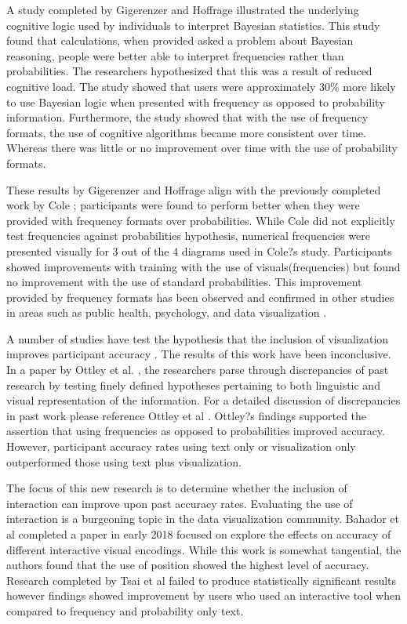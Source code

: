 A study completed by Gigerenzer and Hoffrage \cite{Gigerenzer1995} illustrated the
underlying cognitive logic used by individuals to interpret Bayesian
statistics. This study found that calculations, when provided asked a problem about Bayesian reasoning, people were better able to interpret frequencies rather than probabilities. The researchers
hypothesized that this was a result of reduced cognitive load. The study showed that users were
approximately 30\% more likely to use Bayesian logic when presented with
frequency as opposed to probability information. Furthermore, the study
showed that with the use of frequency formats, the use of cognitive
algorithms became more consistent over time. Whereas there was little or no
improvement over time with the use of probability formats.

These results by Gigerenzer and Hoffrage \cite{Gigerenzer1995} align with the
previously completed work by Cole \cite{Cole1989}; participants were found to
perform better when they were provided with frequency formats over
probabilities. While Cole did not explicitly test frequencies against
probabilities hypothesis, numerical frequencies were presented visually for 3
out of the 4 diagrams used in Cole?s study. Participants showed improvements
with training with the use of visuals(frequencies) but found no improvement
with the use of standard probabilities. This improvement provided by frequency formats has been observed and confirmed in other studies in areas such as public health, psychology, and data visualization \cite{Eddy1982, Galesic2009, Cohen2007, Brown2014, Brase2009}. 

A number of studies have test the hypothesis that the inclusion of
visualization improves participant accuracy \cite{Brown2014, Friederichs2014,
Cohen2007}. The results of this work have been inconclusive. In a paper by
Ottley et al. \cite{Ottley2016}, the researchers parse through discrepancies
of past research by testing finely defined hypotheses pertaining to both
linguistic and visual representation of the information. For a detailed
discussion of discrepancies in past work please reference Ottley et al \cite{Ottley2016}.
Ottley?s findings supported the assertion that using frequencies as opposed to
probabilities improved accuracy. However, participant accuracy rates using
text only or visualization only outperformed those using text plus
visualization.

The focus of this new research is to determine whether the inclusion of
interaction can improve upon past accuracy rates. Evaluating the use of
interaction is a burgeoning topic in the data visualization community.
Bahador et al completed a paper \cite{Saket2018} in early 2018 focused on explore the effects
on accuracy of different interactive visual encodings. While this work is
somewhat tangential, the authors found that the use of position showed the
highest level of accuracy. Research completed by Tsai et al \cite{Tsai2011} failed to
produce statistically significant results however findings showed improvement
by users who used an interactive tool when compared to frequency and
probability only text.




